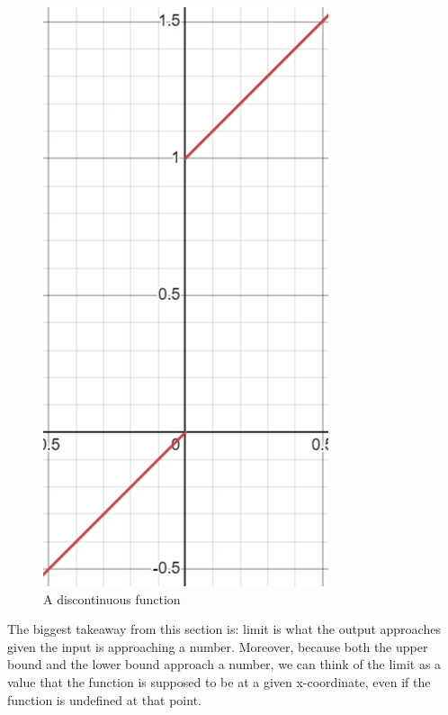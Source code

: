 \begin{figure}
\begin{minipage}{.4\textwidth}
        \label{fig:m2}
    \end{minipage}
    \begin{minipage}{.4\textwidth}
        \centering
        \includegraphics[width=0.75\linewidth]{math/3.png}
        \caption{A discontinuous function}
        \label{fig:m3}
    \end{minipage}
\end{figure}

The biggest takeaway from this section is: limit is what the output approaches given the input is approaching a number. Moreover, because both the upper bound and the lower bound approach a number, we can think of the limit as a value that the function is supposed to be at a given x-coordinate, even if the function is undefined at that point.

